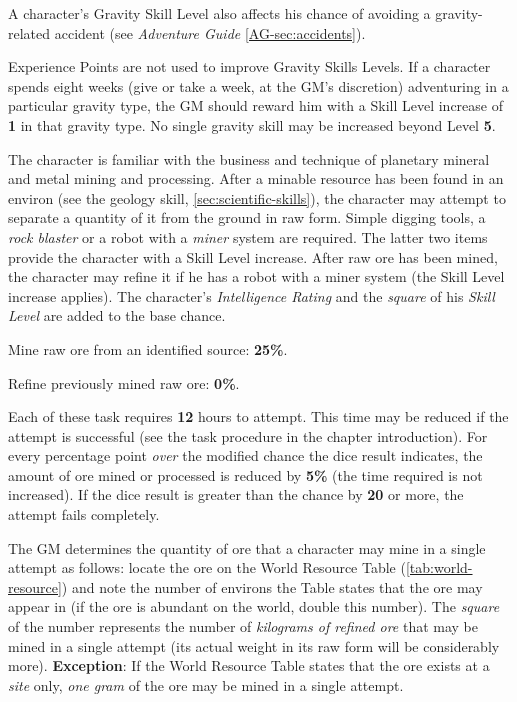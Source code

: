 A character's Gravity Skill Level
also affects his chance of avoiding a gravity-related accident (see
\emph{Adventure Guide} \ref{AG-sec:accidents}).

Experience Points are not used to improve Gravity Skills Levels.  If a
character spends eight weeks (give or take a week, at the GM's
discretion) adventuring in a particular gravity type, the GM should
reward him with a Skill Level increase of \textbf{1} in that gravity
type.  No single gravity skill may be increased beyond Level
\textbf{5}.

\label{sec:skill-mining}

The character is familiar with the business and technique of planetary
mineral and metal mining and processing.  After a minable resource has
been found in an environ (see the geology skill,
\ref{sec:scientific-skills}), the character may attempt to separate a
quantity of it from the ground in raw form.  Simple digging tools, a
\emph{rock blaster} or a robot with a \emph{miner} system are
required.  The latter two items provide the character with a Skill
Level increase.  After raw ore has been mined, the character may refine
it if he has a robot with a miner system (the Skill Level increase
applies).  The character's \emph{Intelligence Rating} and the
\emph{square} of his \emph{Skill Level} are added to the base chance.

\begin{tasklist}
\item Mine raw ore from an identified source: \textbf{25\%}.
\item Refine previously mined raw ore: \textbf{0\%}.
\end{tasklist}  

Each of these task requires \textbf{12} hours to attempt.  This time
may be reduced if the attempt is successful (see the task procedure in
the chapter introduction).  For every percentage point \emph{over} the
modified chance the dice result indicates, the amount of ore mined or
processed is reduced by \textbf{5\%} (the time required is not
increased).  If the dice result is greater than the chance by
\textbf{20} or more, the attempt fails completely.

The GM determines the quantity of ore that a character may mine in a
single attempt as follows: locate the ore on the World Resource Table
(\ref{tab:world-resource}) and note the number of environs the Table states
that the ore may appear in (if the ore is abundant on the world,
double this number).  The \emph{square} of the number represents the
number of \emph{kilograms of refined ore} that may be mined in a
single attempt (its actual weight in its raw form will be considerably
more). \textbf{Exception}: If the World Resource Table states that the
ore exists at a \emph{site} only, \emph{one gram} of the ore may be
mined in a single attempt.

